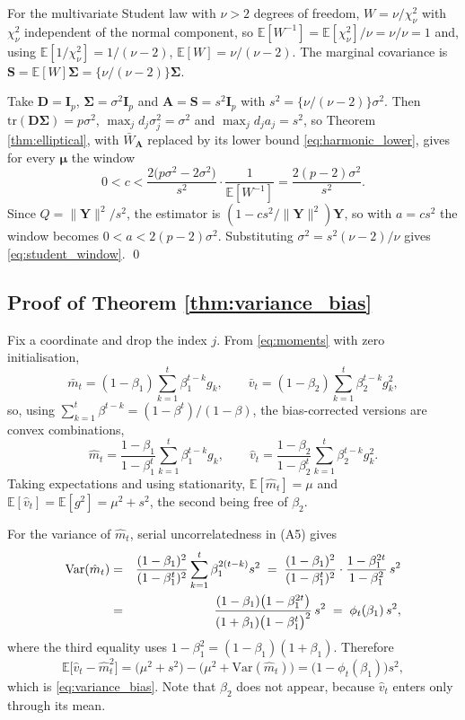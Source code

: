 \documentclass[a4paper,fleqn]{cas-sc}
\theoremstyle{plain}
\theoremstyle{definition}
\theoremstyle{remark}
\newcommand{\rev}[1]{#1}
\newcommand{\tr}{\mathrm{tr}}
\newcommand{\Var}{\mathrm{Var}}
\newcommand{\E}{\mathbb{E}}
\begin{document}
\begin{appendices}
For the multivariate Student law with $\nu>2$ degrees of freedom, $W=\nu/\chi^2_\nu$ with $\chi^2_\nu$ independent of the normal component, so $\E[W^{-1}]=\E[\chi^2_\nu]/\nu=\nu/\nu=1$ and, using $\E[1/\chi^2_\nu]=1/(\nu-2)$, $\E[W]=\nu/(\nu-2)$. The marginal covariance is $\bm S=\E[W]\bm\Sigma=\{\nu/(\nu-2)\}\bm\Sigma$.

Take $\bm D=\bm I_p$, $\bm\Sigma=\sigma^2\bm I_p$ and $\bm A=\bm S=s^2\bm I_p$ with $s^2=\{\nu/(\nu-2)\}\sigma^2$. Then $\tr(\bm D\bm\Sigma)=p\sigma^2$, $\max_jd_j\sigma^2_j=\sigma^2$ and $\max_jd_ja_j=s^2$, so \rev{Theorem \ref{thm:elliptical}, with $\bar W_{\bm A}$ replaced by its lower bound \eqref{eq:harmonic_lower}, gives for every $\bm\mu$ the window}
\begin{equation}
0<c<\frac{2\bigl(p\sigma^2-2\sigma^2\bigr)}{s^2}\cdot\frac{1}{\E[W^{-1}]}
=\frac{2(p-2)\sigma^2}{s^2} .
\end{equation}
Since $Q=\|\bm Y\|^2/s^2$, the estimator is $(1-cs^2/\|\bm Y\|^2)\bm Y$, so with $a=cs^2$ the window becomes $0<a<2(p-2)\sigma^2$. Substituting $\sigma^2=s^2(\nu-2)/\nu$ gives \eqref{eq:student_window}. \qed

\subsection*{Proof of Theorem \ref{thm:variance_bias}}

Fix a coordinate and drop the index $j$. From \eqref{eq:moments} with zero initialisation,
\begin{equation}
\bar m_t=(1-\beta_1)\sum_{k=1}^{t}\beta_1^{t-k}g_k,
\qquad
\bar v_t=(1-\beta_2)\sum_{k=1}^{t}\beta_2^{t-k}g^2_k ,
\end{equation}
so, using $\sum_{k=1}^{t}\beta^{t-k}=(1-\beta^{t})/(1-\beta)$, the bias-corrected versions are convex combinations,
\begin{equation}
\hat m_t=\frac{1-\beta_1}{1-\beta_1^{t}}\sum_{k=1}^{t}\beta_1^{t-k}g_k,
\qquad
\hat v_t=\frac{1-\beta_2}{1-\beta_2^{t}}\sum_{k=1}^{t}\beta_2^{t-k}g^2_k .
\end{equation}
Taking expectations and using stationarity, $\E[\hat m_t]=\mu$ and $\E[\hat v_t]=\E[g^2]=\mu^2+s^2$, the second being free of $\beta_2$.

For the variance of $\hat m_t$, serial uncorrelatedness in (A5) gives
\begin{eqnarray}
\Var(\hat m_t)
&=&
\frac{(1-\beta_1)^2}{(1-\beta_1^{t})^{2}}\sum_{k=1}^{t}\beta_1^{2(t-k)}s^2
\;=\;
\frac{(1-\beta_1)^2}{(1-\beta_1^{t})^{2}}\cdot\frac{1-\beta_1^{2t}}{1-\beta_1^{2}}\,s^2
\cr
&=&
\frac{(1-\beta_1)\bigl(1-\beta_1^{2t}\bigr)}{(1+\beta_1)\bigl(1-\beta_1^{t}\bigr)^{2}}\,s^2
\;=\;
\phi_t(\beta_1)\,s^2 ,
\end{eqnarray}
where the third equality uses $1-\beta_1^2=(1-\beta_1)(1+\beta_1)$. Therefore
\begin{equation}
\E\bigl[\hat v_t-\hat m^2_t\bigr]
=
\bigl(\mu^2+s^2\bigr)-\bigl(\mu^2+\Var(\hat m_t)\bigr)
=
\bigl(1-\phi_t(\beta_1)\bigr)s^2 ,
\end{equation}
which is \eqref{eq:variance_bias}. Note that $\beta_2$ does not appear, because $\hat v_t$ enters only through its mean.


\end{appendices}
\end{document}
